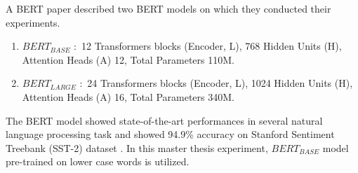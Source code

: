 \documentclass[%
	BCOR=8mm, %
	DIV=12,
	toc=bibliography, %
	toc=listof, %
	oneside, %
	egregdoesnotlikesansseriftitles, %
	]{scrbook}
\begin{document}
A BERT paper \cite{devlin_bert_2019-1} described two BERT models on which they conducted their experiments. 
\begin{enumerate}
    \item $BERT_{BASE}$ $:$ 12 Transformers blocks (Encoder, L), 768 Hidden Units (H), Attention Heads (A) 12, Total Parameters 110M.
    \item $BERT_{LARGE}$ $:$ 24 Transformers blocks (Encoder, L), 1024 Hidden Units (H), Attention Heads (A) 16, Total Parameters 340M.
\end{enumerate}
The BERT model showed state-of-the-art performances in several natural language processing task and showed 94.9\% accuracy on  Stanford Sentiment Treebank (SST-2) dataset \cite{socher_recursive_2013}. In this master thesis experiment, $BERT_{BASE}$ model pre-trained on lower case words is utilized. 
\end{document}
